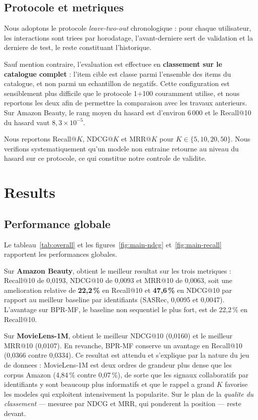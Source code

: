 \subsection{Protocole et metriques}
\label{sec:protocol}

Nous adoptons le protocole \emph{leave-two-out} chronologique : pour chaque
utilisateur, les interactions sont triees par horodatage, l'avant-derniere sert
de validation et la derniere de test, le reste constituant l'historique.

Sauf mention contraire, l'evaluation est effectuee en \textbf{classement sur le
catalogue complet} : l'item cible est classe parmi l'ensemble des items du
catalogue, et non parmi un echantillon de negatifs. Cette configuration est
sensiblement plus difficile que le protocole 1+100 couramment utilise, et nous
reportons les deux afin de permettre la comparaison avec les travaux
anterieurs. Sur Amazon Beauty, le rang moyen du hasard est d'environ 6\,000 et
le Recall@10 du hasard vaut $8{,}3\times 10^{-5}$.

Nous reportons Recall@$K$, NDCG@$K$ et MRR@$K$ pour $K\in\{5,10,20,50\}$.
Nous verifions systematiquement qu'un modele non entraine retourne au niveau du
hasard sur ce protocole, ce qui constitue notre controle de validite.

\section{Results}
\label{sec:results}

\subsection{Performance globale}
\label{sec:overall}

Le tableau~\ref{tab:overall} et les figures~\ref{fig:main-ndcg}
et~\ref{fig:main-recall} rapportent les performances globales.

Sur \textbf{Amazon Beauty}, \model{} obtient le meilleur resultat sur les trois
metriques : Recall@10 de 0,0193, NDCG@10 de 0,0093 et MRR@10 de 0,0063,
soit une amelioration relative de \textbf{22,2\,\%} en Recall@10 et
\textbf{47,6\,\%} en NDCG@10 par rapport au meilleur baseline par identifiants
(SASRec, 0,0095 et 0,0047). L'avantage sur BPR-MF, le baseline non sequentiel
le plus fort, est de 22,2\,\% en Recall@10.

Sur \textbf{MovieLens-1M}, \model{} obtient le meilleur NDCG@10 (0,0160) et le
meilleur MRR@10 (0,0107). En revanche, BPR-MF conserve un avantage en
Recall@10 (0,0366 contre 0,0334). Ce resultat est attendu et s'explique par la
nature du jeu de donnees : MovieLens-1M est deux ordres de grandeur plus dense
que les corpus Amazon (4,84\,\% contre 0,07\,\%), de sorte que les signaux
collaboratifs par identifiants y sont beaucoup plus informatifs et que le
rappel a grand $K$ favorise les modeles qui exploitent intensivement la
popularite. Sur le plan de la \emph{qualite du classement} --- mesuree par
NDCG et MRR, qui ponderent la position --- \model{} reste devant.

